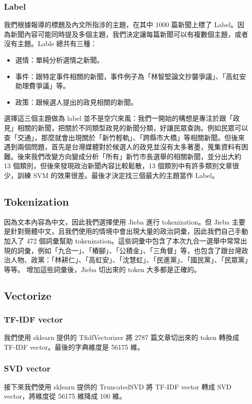 \documentclass[12pt,cleanfoot,twocolumn]{asme2ej}
\begin{document}
\subsubsection{Label}
我們根據報導的標題及內文所指涉的主題，在其中 1000 篇新聞上標了 Label。因為新聞內容可能同時提及多個主題，我們決定讓每篇新聞可以有複數個主題，或者沒有主題。Lable 總共有三種：
\begin{itemize}
        \item 選情：單純分析選情之新聞。
        \item 事件：跟特定事件相關的新聞，事件例子為「林智堅論文抄襲爭議」、「高虹安助理費爭議」等。
        \item 政策：跟候選人提出的政見相關的新聞。
\end{itemize}
選擇這三個主題做為 label 並不是空穴來風：我們一開始的構想是專注於跟「政見」相關的新聞，把關於不同類型政見的新聞分類，好讓民眾查詢。例如民眾可以查「交通」，那麼就會出現關於「新竹輕軌」、「跨縣市大橋」等相關新聞。但後來遇到兩個問題，首先是台灣媒體對於候選人的政見並沒有太多著墨，蒐集資料有困難。後來我們改變方向變成分析「所有」新竹市長選舉的相關新聞，並分出大約 13 個類別，但後來發現政治新聞內容比較鬆散，13 個類別中有許多類別文章很少，訓練 SVM 的效果很差。最後才決定找三個最大的主題當作 Label。

\subsection{Tokenization}
因為文本內容為中文，因此我們選擇使用 Jieba 進行 tokenization。但 Jieba 主要是針對簡體中文，且我們使用的情境中會出現大量的政治詞彙，因此我們自己手動加入了 472 個詞彙幫助 tokenization。這些詞彙中包含了本次九合一選舉中常常出現的詞彙，例如「九合一」、「樁腳」、「公積金」、「三角督」等，也包含了跟台灣政治人物、政黨：「林耕仁」、「高虹安」、「沈慧虹」、「民進黨」、「國民黨」、「民眾黨」等等。
增加這些詞彙後，Jieba 切出來的 token 大多都是正確的。

\subsection{Vectorize}
\subsubsection{TF-IDF vector}
我們使用 sklearn 提供的 TfidfVectorizer 將 2787 篇文章切出來的 token 轉換成 TF-IDF vector。最後的字典維度是 56175 維。

\subsubsection{SVD vector}
接下來我們使用 sklearn 提供的 TruncatedSVD 將 TF-IDF vector 轉成 SVD vector，將維度從 56175 維降成 100 維。
\end{document}
